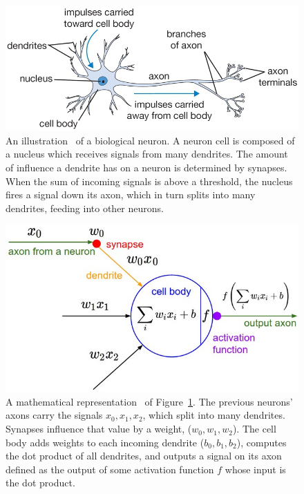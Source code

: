 \begin{minipage}[c]{0.5\textwidth}
   \begin{figure}[H]
      \centering
      \captionsetup{width=.9\linewidth}
      \includegraphics[width=\textwidth]{figs/cellneuron.png}
      \caption{An illustration~\cite{cs231} of a biological neuron. A neuron cell is composed of a nucleus which receives signals from many dendrites. The amount of influence a dendrite has on a neuron is determined by synapses. When the sum of incoming signals is above a threshold, the nucleus fires a signal down its axon, which in turn splits into many dendrites, feeding into other neurons.} 
      \label{fig:sub:cell}
   \end{figure}
\end{minipage}%
\begin{minipage}[c]{0.5\textwidth}
   \begin{figure}[H]
      \centering
      \captionsetup{width=.9\linewidth}
      \includegraphics[width=\textwidth]{figs/neuron_model.jpeg}
      \caption{A mathematical representation~\cite{cs231} of Figure~\ref{fig:sub:cell}. The previous neurons' axons carry the signals $x_0, x_1, x_2$, which split into many dendrites. Synapses influence that value by a weight, ($w_0, w_1, w_2$). The cell body adds weights to each incoming dendrite ($b_0, b_1, b_2$), computes the dot product of all dendrites, and outputs a signal on its axon defined as the output of some activation function $f$ whose input is the dot product.} 
      \label{fig:sub:neuron}
   \end{figure}
\end{minipage}


